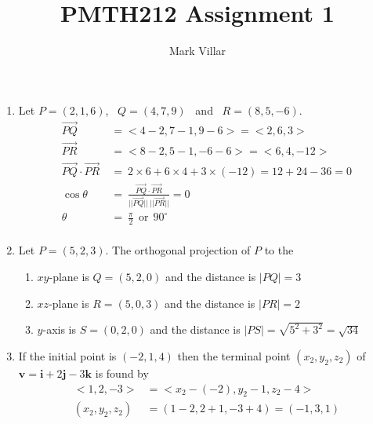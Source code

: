 \documentclass[12pt]{amsart}
\title{PMTH212 Assignment 1}
\author{Mark Villar}
\begin{document}
 

\maketitle 

\begin{enumerate}
	
	\item Let $P=(2,1,6)$, \ $Q=(4,7,9)$ \ and \ $R=(8,5,-6)$.
		\begin{align*}
			\overrightarrow{PQ} &= \big<4-2, 7-1, 9-6\big> = \big<2,6,3\big> \\
			\overrightarrow{PR} &= \big<8-2, 5-1, -6-6\big> = \big<6,4,-12\big> \\
			\overrightarrow{PQ}\cdot\overrightarrow{PR}\ &=\ 2\times6+6\times4+3\times(-12)=12+24-36=0			\\
			\cos \theta \ &= \ \frac{\overrightarrow{PQ}\cdot\overrightarrow{PR}}{||\overrightarrow{PQ}|| \ ||
			\overrightarrow{PR} ||} = 0 \\
			\theta \ &= \ \frac{\pi}{2} \ \ \text{or} \ \ 90^\circ \\
		\end{align*}
		
	\item Let $P=(5,2,3)$.  The orthogonal projection of $P$ to the
		
		\begin{enumerate}
		
			\item $xy$-plane is $Q=(5,2,0)$ and the distance is $|PQ|=3$
			
			\item $xz$-plane is $R=(5,0,3)$ and the distance is $|PR|=2$
			
			\item $y$-axis is $S=(0,2,0)$ and the distance is $|PS|=\sqrt{5^2+3^2}=\sqrt{34}$ \\	
			
		\end{enumerate}
					
	\item If the initial point is $(-2,1,4)$ then the terminal point $(x_2,y_2,z_2)$ of $\mathbf{v}=\mathbf{i}+2			\mathbf{j}-3\mathbf{k}$ is found by
		\begin{align*}
			\big<1,2,-3\big> &= \big<x_2-(-2), y_2-1, z_2-4\big> \\
			(x_2, y_2, z_2) &= (1-2, 2+1, -3+4) = (-1, 3,1)
		\end{align*}
		\smallskip
				

\end{enumerate}
\end{document}
